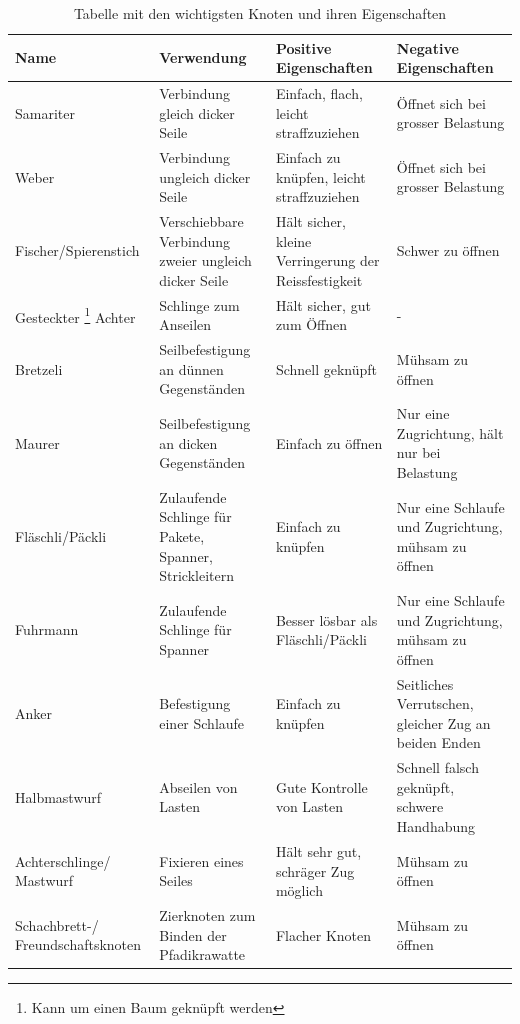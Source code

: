 \begin{center}
\begin{table}
\begin{tabularx}{\textwidth}{X|X|X|X}
\textbf{Name} & \textbf{Verwendung} & \textbf{Positive Eigenschaften} & \textbf{Negative Eigenschaften} \\\hline
Samariter & Verbindung gleich dicker Seile & Einfach, flach, leicht straffzuziehen & Öffnet sich bei grosser Belastung \\\hline
Weber & Verbindung ungleich dicker Seile & Einfach zu knüpfen, leicht straffzuziehen & Öffnet sich bei grosser Belastung \\\hline
Fischer/Spierenstich & Verschiebbare Verbindung zweier ungleich dicker Seile & Hält sicher, kleine Verringerung der Reissfestigkeit & Schwer zu öffnen \\\hline
Gesteckter \footnote{Kann um einen Baum geknüpft werden} Achter & Schlinge zum Anseilen & Hält sicher, gut zum Öffnen & - \\\hline
Bretzeli & Seilbefestigung an dünnen Gegenständen & Schnell geknüpft & Mühsam zu öffnen \\\hline
Maurer & Seilbefestigung an dicken Gegenständen & Einfach zu öffnen & Nur eine Zugrichtung, hält nur bei Belastung \\\hline
Fläschli/Päckli & Zulaufende Schlinge für Pakete, Spanner, Strickleitern & Einfach zu knüpfen & Nur eine Schlaufe und Zugrichtung, mühsam zu öffnen \\\hline
Fuhrmann & Zulaufende Schlinge für Spanner & Besser lösbar als Fläschli/Päckli & Nur eine Schlaufe und Zugrichtung, mühsam zu öffnen \\\hline
Anker & Befestigung einer Schlaufe & Einfach zu knüpfen & Seitliches Verrutschen, gleicher Zug an beiden Enden \\\hline
Halbmastwurf & Abseilen von Lasten & Gute Kontrolle von Lasten & Schnell falsch geknüpft, schwere Handhabung \\\hline
Achterschlinge/ Mastwurf & Fixieren eines Seiles & Hält sehr gut, schräger Zug möglich & Mühsam zu öffnen \\\hline
Schachbrett-/ Freundschaftsknoten & Zierknoten zum Binden der Pfadikrawatte & Flacher Knoten & Mühsam zu öffnen \\
\end{tabularx}
\caption{Tabelle mit den wichtigsten Knoten und ihren Eigenschaften}
\end{table}
\end{center}


